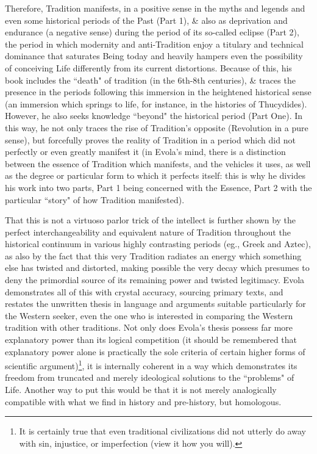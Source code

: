 Therefore, Tradition manifests, in a positive sense in the myths and legends and even some historical periods of the Past (Part 1), \& also as deprivation and endurance (a negative sense) during the period of its so-called eclipse (Part 2), the period in which modernity and anti-Tradition enjoy a titulary and technical dominance that saturates Being today and heavily hampers even the possibility of conceiving Life differently from its current distortions. Because of this, his book includes the ``death" of tradition (in the 6th-8th centuries), \& traces the presence in the periods following this immersion in the heightened historical sense (an immersion which springs to life, for instance, in the histories of Thucydides). However, he also seeks knowledge ``beyond" the historical period (Part One). In this way, he not only traces the rise of Tradition's opposite (Revolution in a pure sense), but forcefully proves the reality of Tradition in a period which did not perfectly or even greatly manifest it (in Evola's mind, there is a distinction between the essence of Tradition which manifests, and the vehicles it uses, as well as the degree or particular form to which it perfects itself: this is why he divides his work into two parts, Part 1 being concerned with the Essence, Part 2 with the particular ``story" of how Tradition manifested).

That this is not a virtuoso parlor trick of the intellect is further shown by the perfect interchangeability and equivalent nature of Tradition throughout the historical continuum in various highly contrasting periods (eg., Greek and Aztec), as also by the fact that this very Tradition radiates an energy which something else has twisted and distorted, making possible the very decay which presumes to deny the primordial source of its remaining power and twisted legitimacy. Evola demonstrates all of this with crystal accuracy, sourcing primary texts, and restates the unwritten thesis in language and arguments suitable particularly for the Western seeker, even the one who is interested in comparing the Western tradition with other traditions. Not only does Evola's thesis possess far more explanatory power than its logical competition (it should be remembered that explanatory power alone is practically the sole criteria of certain higher forms of scientific argument)\footnote{It is certainly true that even traditional civilizations did not utterly do away with sin, injustice, or imperfection (view it how you will).}, it is internally coherent in a way which demonstrates its freedom from truncated and merely ideological solutions to the ``problems" of Life. Another way to put this would be that it is not merely analogically compatible with what we find in history and pre-history, but homologous.

